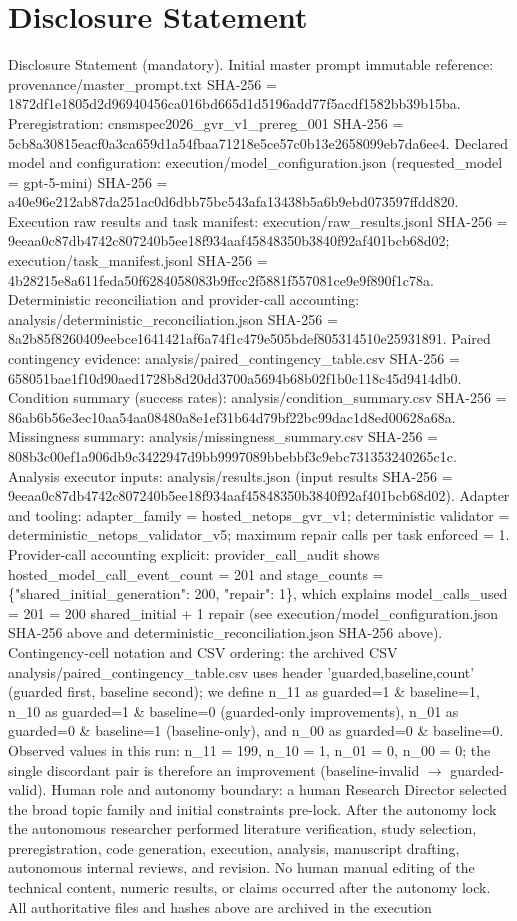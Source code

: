 \documentclass[conference]{IEEEtran}
\begin{document}
\section*{Disclosure Statement}
Disclosure Statement (mandatory). Initial master prompt immutable reference: provenance/master\_prompt.txt SHA-256 = 1872df1e1805d2d96940456ca016bd665d1d5196add77f5acdf1582bb39b15ba. Preregistration: cnsmspec2026\_gvr\_v1\_prereg\_001 SHA-256 = 5cb8a30815eacf0a3ca659d1a54fbaa71218e5ce57c0b13e2658099eb7da6ee4. Declared model and configuration: execution/model\_configuration.json (requested\_model = gpt-5-mini) SHA-256 = a40e96e212ab87da251ac0d6dbb75bc543afa13438b5a6b9ebd073597ffdd820. Execution raw results and task manifest: execution/raw\_results.jsonl SHA-256 = 9eeaa0c87db4742c807240b5ee18f934aaf45848350b3840f92af401bcb68d02; execution/task\_manifest.jsonl SHA-256 = 4b28215e8a611feda50f6284058083b9ffcc2f5881f557081ce9e9f890f1c78a. Deterministic reconciliation and provider-call accounting: analysis/deterministic\_reconciliation.json SHA-256 = 8a2b85f8260409eebce1641421af6a74f1c479e505bdef805314510e25931891. Paired contingency evidence: analysis/paired\_contingency\_table.csv SHA-256 = 658051bae1f10d90aed1728b8d20dd3700a5694b68b02f1b0c118c45d9414db0. Condition summary (success rates): analysis/condition\_summary.csv SHA-256 = 86ab6b56e3ec10aa54aa08480a8e1ef31b64d79bf22bc99dac1d8ed00628a68a. Missingness summary: analysis/missingness\_summary.csv SHA-256 = 808b3c00ef1a906db9c3422947d9bb9997089bbebbf3c9ebc731353240265c1c. Analysis executor inputs: analysis/results.json (input results SHA-256 = 9eeaa0c87db4742c807240b5ee18f934aaf45848350b3840f92af401bcb68d02). Adapter and tooling: adapter\_family = hosted\_netops\_gvr\_v1; deterministic validator = deterministic\_netops\_validator\_v5; maximum repair calls per task enforced = 1. Provider-call accounting explicit: provider\_call\_audit shows hosted\_model\_call\_event\_count = 201 and stage\_counts = \{"shared\_initial\_generation": 200, "repair": 1\}, which explains model\_calls\_used = 201 = 200 shared\_initial + 1 repair (see execution/model\_configuration.json SHA-256 above and deterministic\_reconciliation.json SHA-256 above). Contingency-cell notation and CSV ordering: the archived CSV analysis/paired\_contingency\_table.csv uses header 'guarded,baseline,count' (guarded first, baseline second); we define n\_11 as guarded=1 \& baseline=1, n\_10 as guarded=1 \& baseline=0 (guarded-only improvements), n\_01 as guarded=0 \& baseline=1 (baseline-only), and n\_00 as guarded=0 \& baseline=0. Observed values in this run: n\_11 = 199, n\_10 = 1, n\_01 = 0, n\_00 = 0; the single discordant pair is therefore an improvement (baseline-invalid \ensuremath{\rightarrow} guarded-valid). Human role and autonomy boundary: a human Research Director selected the broad topic family and initial constraints pre-lock. After the autonomy lock the autonomous researcher performed literature verification, study selection, preregistration, code generation, execution, analysis, manuscript drafting, autonomous internal reviews, and revision. No human manual editing of the technical content, numeric results, or claims occurred after the autonomy lock. All authoritative files and hashes above are archived in the execution 
\end{document}
